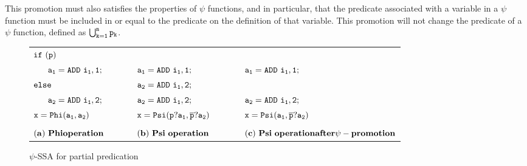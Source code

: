 \begin{itemize}
This promotion must also satisfies the properties of $\psi$
functions, and in particular, that the predicate associated with a
variable in a $\psi$ function must be included in or equal to the
predicate on the definition of that variable. This promotion will not
change the predicate of a $\psi$ function, defined as ${\tt
  \bigcup_{k=1}^n p_k}$.

\begin{figure*}
\begin{center}
\footnotesize
\begin{tabular}{llllll}
${\tt if\ (p)}$                   &          &                                          &          & \\
${\tt\ \ \ \ \ a_1 = ADD\ i_1,1;}$ & \ \ \ \  & ${\tt a_1 = ADD\ i_1,1;}$                & \ \ \ \  & ${\tt a_1 = ADD\ i_1,1;}$ \\
${\tt else}$                      & \ \ \ \  & ${\tt a_2 = ADD\ i_1,2;}$                & \ \ \ \  & \\
${\tt\ \ \ \ \ a_2 = ADD\ i_1,2;}$ & \ \ \ \  & ${\tt a_2 = ADD\ i_1,2;}$                & \ \ \ \  & ${\tt a_2 = ADD\ i_1,2;}$ \\
${\tt x = Phi(a_1, a_2)}$          & \ \ \ \  & ${\tt x = Psi(p?a_1, \overline{p}?a_2)}$ & \ \ \ \  & ${\tt x = Psi(a_1, \overline{p}?a_2)}$ \\
\\
\multicolumn{2}{l}{${\tt{\bf (a)\ Phi operation}}$} & \multicolumn{2}{l}{${\tt{\bf (b)\ Psi\ operation}}$} & \multicolumn{2}{l}{${\tt{\bf (c)\ Psi\ operation after \psi-promotion}}$} \\
\end{tabular}
\caption{$\psi$-SSA for partial predication}
\label{fig:psi_partial}
\end{center}
\end{figure*}






\end{itemize}
